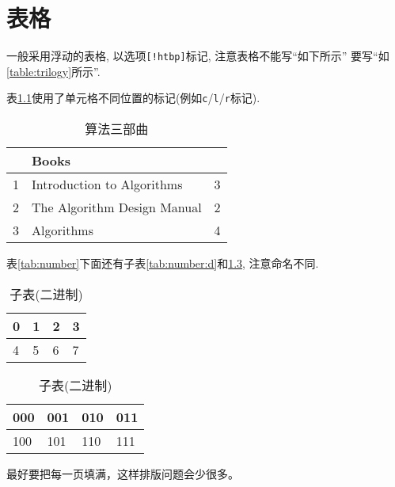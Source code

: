 \chapter{表格}


  一般采用浮动的表格, 以选项\texttt{[!htbp]}标记, 注意表格不能写``如下所示''
要写``如\ref{table:trilogy}所示''.


  表\ref{tab:trilogy}使用了单元格不同位置的标记(例如\texttt{c}/\texttt{l}/\texttt{r}标记).

\begin{table}[!hbtp]
\centering
\begin{tabular}{|c|l|r|}
\hline
    & Books                         &     \\ \hline
1   & Introduction to Algorithms    & 3 \\
2   & The Algorithm Design Manual   & 2 \\
3   & Algorithms                    & 4 \\
\hline
\end{tabular}
\caption{算法三部曲}
\label{tab:trilogy}
\end{table}


  表\ref{tab:number}下面还有子表\ref{tab:number:d}和\ref{tab:number:b}, 注意命名不同.

\begin{table}[!htb]
\centering
  \caption{主表}
  \label{tab:number}
\begin{subtable}[t]{2in}
  \centering
  \begin{tabular}{|l|l|l|l|}
  \hline
  0 & 1 & 2 & 3 \\
  \hline
  4 & 5 & 6 & 7 \\
  \hline
  \end{tabular}
  \caption{子表(十进制)}\label{tab:number:d}
\end{subtable}
\quad
\begin{subtable}[t]{2in}
  \centering
  \begin{tabular}{|l|l|l|l|}
  \hline
  000 & 001 & 010 & 011 \\
  \hline
  100 & 101 & 110 & 111 \\
  \hline
  \end{tabular}
  \caption{子表(二进制)}\label{tab:number:b}
\end{subtable}
\end{table}

最好要把每一页填满，这样排版问题会少很多。
